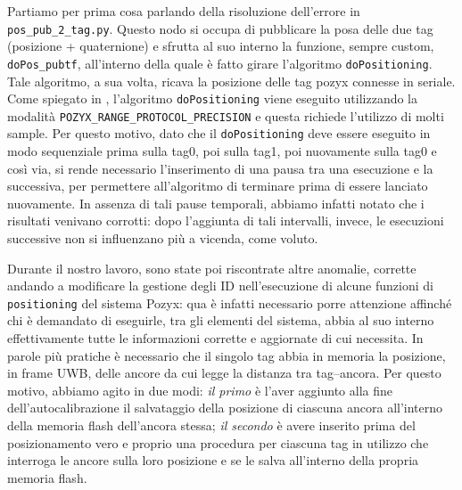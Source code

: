 Partiamo per prima cosa parlando della risoluzione dell'errore in \verb|pos_pub_2_tag.py|. 
Questo nodo si occupa di pubblicare la posa delle due tag (posizione + quaternione) e sfrutta al suo interno  la funzione, sempre custom, \verb|doPos_pubtf|, all'interno della quale è fatto girare l'algoritmo \verb|doPositioning|. 
Tale algoritmo, a sua volta, ricava la posizione delle tag pozyx connesse in seriale. 
Come spiegato in \cite{ctesconistudio}, l'algoritmo \verb|doPositioning| viene eseguito utilizzando la modalità \verb|POZYX_RANGE_PROTOCOL_PRECISION| e questa richiede l'utilizzo di molti sample. 
Per questo motivo, dato che il \verb|doPositioning| deve essere eseguito  in modo sequenziale prima sulla tag0, poi sulla tag1, poi nuovamente sulla tag0 e così via, si rende necessario l'inserimento di una pausa tra una esecuzione e la successiva, per permettere all'algoritmo di terminare prima di essere lanciato nuovamente. 
In assenza di tali pause temporali, abbiamo infatti notato che i risultati venivano corrotti: dopo l'aggiunta di tali intervalli, invece, le esecuzioni successive non si influenzano più a vicenda, come voluto.

Durante il nostro lavoro, sono state poi riscontrate altre anomalie, corrette andando a modificare la gestione degli ID nell'esecuzione di alcune funzioni di \verb|positioning| del sistema Pozyx: qua è infatti necessario porre attenzione affinché chi è demandato di eseguirle, tra gli elementi del sistema, abbia al suo interno effettivamente tutte le informazioni corrette e aggiornate di cui necessita. 
In parole pi\`u pratiche \`e necessario che il singolo tag abbia in memoria la posizione, in frame UWB, delle ancore da cui legge la distanza tra tag--ancora.
Per questo motivo, abbiamo agito in due modi: \textit{il primo} \`e l'aver aggiunto alla fine dell'autocalibrazione il salvataggio della posizione di ciascuna ancora all'interno della memoria flash dell'ancora stessa; \textit{il secondo} \`e avere inserito prima del posizionamento vero e proprio una procedura per ciascuna tag in utilizzo che interroga le ancore sulla loro posizione e se le salva all'interno della propria memoria flash.

